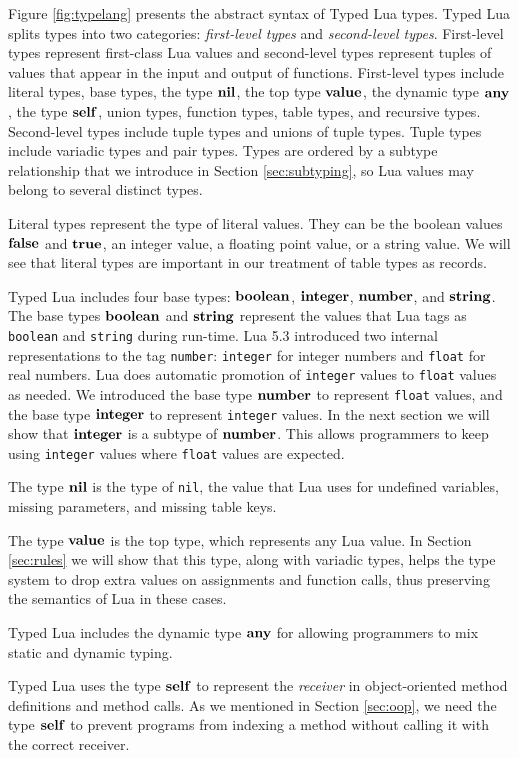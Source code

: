 Figure \ref{fig:typelang} presents the abstract syntax of
Typed Lua types.
Typed Lua splits types into two categories:
\emph{first-level types} and \emph{second-level types}.
First-level types represent first-class Lua values and
second-level types represent tuples of values that appear in the
input and output of functions.
First-level types include literal types, base types, the type $\mathbf{nil}$,
the top type $\mathbf{value}$, the dynamic type $\mathbf{any}$, the type $\mathbf{self}$,
union types, function types, table types, and recursive types.
Second-level types include tuple types and unions of tuple types.
Tuple types include variadic types and pair types.
Types are ordered by a subtype relationship that we introduce
in Section \ref{sec:subtyping}, so Lua values may belong to
several distinct types.

Literal types represent the type of literal values.
They can be the boolean values $\mathbf{false}$ and $\mathbf{true}$,
an integer value, a floating point value, or a string value.
We will see that literal types are important in our treatment of
table types as records.

Typed Lua includes four base types: $\mathbf{boolean}$, $\mathbf{integer}$, $\mathbf{number}$, and $\mathbf{string}$.
The base types $\mathbf{boolean}$ and $\mathbf{string}$ represent the values that
Lua tags as \texttt{boolean} and \texttt{string} during run-time.
Lua 5.3 introduced two internal representations to the tag \texttt{number}:
\texttt{integer} for integer numbers and \texttt{float} for real numbers.
Lua does automatic promotion of \texttt{integer} values to \texttt{float}
values as needed.
We introduced the base type $\mathbf{number}$ to represent \texttt{float} values,
and the base type $\mathbf{integer}$ to represent \texttt{integer} values.
In the next section we will show that $\mathbf{integer}$ is a subtype of $\mathbf{number}$.
This allows programmers to keep using \texttt{integer} values where
\texttt{float} values are expected.

The type $\mathbf{nil}$ is the type of \texttt{nil}, the value that Lua uses for
undefined variables, missing parameters, and missing table keys.

The type $\mathbf{value}$ is the top type, which represents any Lua value.
In Section \ref{sec:rules} we will show that this type,
along with variadic types, helps the type system to drop extra values
on assignments and function calls, thus preserving the
semantics of Lua in these cases.

Typed Lua includes the dynamic type $\mathbf{any}$ for allowing programmers
to mix static and dynamic typing.

Typed Lua uses the type $\mathbf{self}$ to represent the \emph{receiver}
in object-oriented method definitions and method calls.
As we mentioned in Section \ref{sec:oop}, we need the type
$\mathbf{self}$ to prevent programs from indexing a method without
calling it with the correct receiver.

